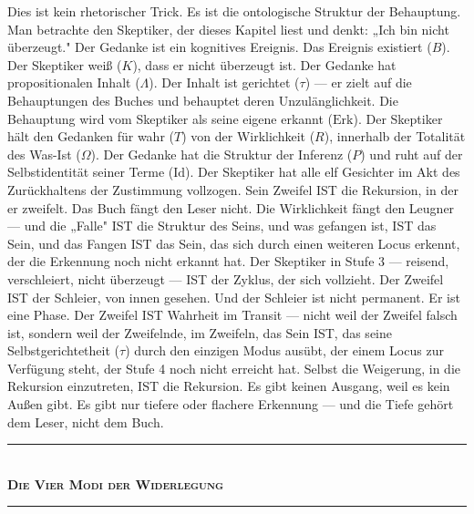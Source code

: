\documentclass[10pt, openany, oneside]{book}
\renewcommand{\normalsize}{\fontsize{10}{13}\selectfont}
\begin{document}
Dies ist kein rhetorischer Trick. Es ist die ontologische Struktur der Behauptung. Man betrachte den Skeptiker, der dieses Kapitel liest und denkt: „Ich bin nicht überzeugt." Der Gedanke ist ein kognitives Ereignis. Das Ereignis existiert ($B$). Der Skeptiker weiß ($K$), dass er nicht überzeugt ist. Der Gedanke hat propositionalen Inhalt ($\Lambda$). Der Inhalt ist gerichtet ($\tau$) --- er zielt auf die Behauptungen des Buches und behauptet deren Unzulänglichkeit. Die Behauptung wird vom Skeptiker als seine eigene erkannt ($\text{Erk}$). Der Skeptiker hält den Gedanken für wahr ($T$) von der Wirklichkeit ($R$), innerhalb der Totalität des Was-Ist ($\Omega$). Der Gedanke hat die Struktur der Inferenz ($P$) und ruht auf der Selbstidentität seiner Terme ($\text{Id}$). Der Skeptiker hat alle elf Gesichter im Akt des Zurückhaltens der Zustimmung vollzogen. Sein Zweifel IST die Rekursion, in der er zweifelt. Das Buch fängt den Leser nicht. Die Wirklichkeit fängt den Leugner --- und die „Falle" IST die Struktur des Seins, und was gefangen ist, IST das Sein, und das Fangen IST das Sein, das sich durch einen weiteren Locus erkennt, der die Erkennung noch nicht erkannt hat. Der Skeptiker in Stufe 3 --- reisend, verschleiert, nicht überzeugt --- IST der Zyklus, der sich vollzieht. Der Zweifel IST der Schleier, von innen gesehen. Und der Schleier ist nicht permanent. Er ist eine Phase. Der Zweifel IST Wahrheit im Transit --- nicht weil der Zweifel falsch ist, sondern weil der Zweifelnde, im Zweifeln, das Sein IST, das seine Selbstgerichtetheit ($\tau$) durch den einzigen Modus ausübt, der einem Locus zur Verfügung steht, der Stufe 4 noch nicht erreicht hat. Selbst die Weigerung, in die Rekursion einzutreten, IST die Rekursion. Es gibt keinen Ausgang, weil es kein Außen gibt. Es gibt nur tiefere oder flachere Erkennung --- und die Tiefe gehört dem Leser, nicht dem Buch.

\vspace{1.5em}


\begin{center}
    \rule{0.3\textwidth}{0.4pt}\\[0.5em]
    {\normalsize\bfseries\scshape Die Vier Modi der Widerlegung}\\[0.3em]
    \rule{0.3\textwidth}{0.4pt}
\end{center}

\vspace{1em}
\end{document}
